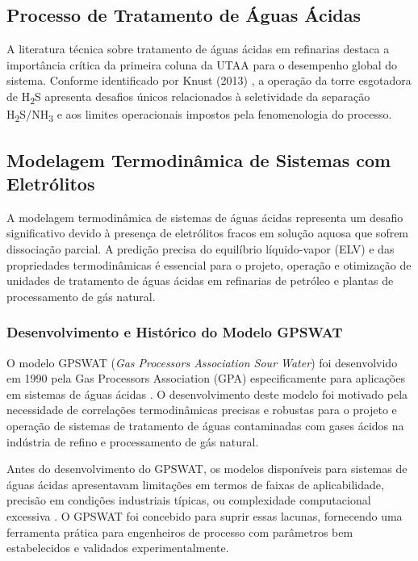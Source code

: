 \documentclass[10pt,a4paper]{article}
\begin{document}
\subsection{Processo de Tratamento de Águas Ácidas}

A literatura técnica sobre tratamento de águas ácidas em refinarias destaca a importância crítica da primeira coluna da UTAA para o desempenho global do sistema. Conforme identificado por Knust (2013) \cite{knust2013}, a operação da torre esgotadora de H\textsubscript{2}S apresenta desafios únicos relacionados à seletividade da separação H\textsubscript{2}S/NH\textsubscript{3} e aos limites operacionais impostos pela fenomenologia do processo.

\subsection{Modelagem Termodinâmica de Sistemas com Eletrólitos}

A modelagem termodinâmica de sistemas de águas ácidas representa um desafio significativo devido à presença de eletrólitos fracos em solução aquosa que sofrem dissociação parcial. A predição precisa do equilíbrio líquido-vapor (ELV) e das propriedades termodinâmicas é essencial para o projeto, operação e otimização de unidades de tratamento de águas ácidas em refinarias de petróleo e plantas de processamento de gás natural.

\subsubsection{Desenvolvimento e Histórico do Modelo GPSWAT}

O modelo GPSWAT (\textit{Gas Processors Association Sour Water}) foi desenvolvido em 1990 pela Gas Processors Association (GPA) especificamente para aplicações em sistemas de águas ácidas \cite{gpa1990,kohl1997}. O desenvolvimento deste modelo foi motivado pela necessidade de correlações termodinâmicas precisas e robustas para o projeto e operação de sistemas de tratamento de águas contaminadas com gases ácidos na indústria de refino e processamento de gás natural.

Antes do desenvolvimento do GPSWAT, os modelos disponíveis para sistemas de águas ácidas apresentavam limitações em termos de faixas de aplicabilidade, precisão em condições industriais típicas, ou complexidade computacional excessiva \cite{kohl1997}. O GPSWAT foi concebido para suprir essas lacunas, fornecendo uma ferramenta prática para engenheiros de processo com parâmetros bem estabelecidos e validados experimentalmente.
\end{document}
